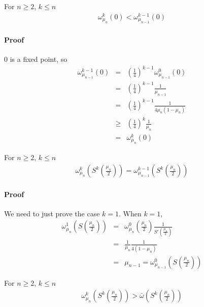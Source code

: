 \begin{lemma}
For $n \ge 2$, $k \le n$
 \begin{eqnarray}
   \omega_{\mu_n}^k(0) <\omega_{\mu_{n-1}}^{k-1}(0)
 \end{eqnarray}
\end{lemma}
\paragraph{Proof}
$0$ is a fixed point, so 
  \begin{eqnarray}
     \omega_{\mu_{n-1}}^{k-1}(0) 
                    & = & \left( \frac{1}{4} \right)^{k-1} \omega_{\mu_{n-1}}^{0}(0) \nonumber\\
                    & = & \left( \frac{1}{4} \right)^{k-1} \frac{1}{\mu_{n-1}}\nonumber\\
                    & = & \left( \frac{1}{4} \right)^{k-1} \frac{1}{4{\mu_n}(1-\mu_n)}\nonumber\\
                    &\ge& \left( \frac{1}{4} \right)^{k} \frac{1}{\mu_n} \nonumber\\
                    & = & \omega_{\mu_n}^k(0)
  \end{eqnarray}
\begin{lemma}
For $n \ge 2$, $k \le n$
  \begin{eqnarray}
 \omega_{\mu_n}^k \left(S^k \left(\frac{\mu_n}{2}\right)\right) =\omega_{\mu_{n-1}}^{k-1} \left(S^k \left(\frac{\mu_n}{2}\right)\right)
  \end{eqnarray}
\end{lemma}
\paragraph{Proof}
We need to just prove the case $k=1$. When $k=1$,  
  \begin{eqnarray}
 \omega_{\mu_n}^1 \left(S \left(\frac{\mu_n}{2}\right)\right)
                    & = & \omega_{\mu_n}^0  \left(\frac{\mu_n}{2}\right) \frac{1}{S' \left( \frac{\mu_n}{2}\right)}\nonumber \\
                    & = & \frac{1}{\mu_n} \frac{1}{4(1-\mu_n)} \nonumber\\
                    & = & \mu_{n-1} = \omega_{\mu_{n-1}}^0 \left(S\left(\frac{\mu_n}{2}\right)\right)  
  \end{eqnarray}

\begin{lemma}
For $n \ge 2$, $k \le n$
 \begin{eqnarray}
  \omega_{\mu_n}^k \left(S^k \left(\frac{\mu_n}{2}\right)\right) > 
   \bar{\omega} \left(S^k \left(\frac{\mu_n}{2}\right)\right)
 \end{eqnarray} 
\end{lemma}
